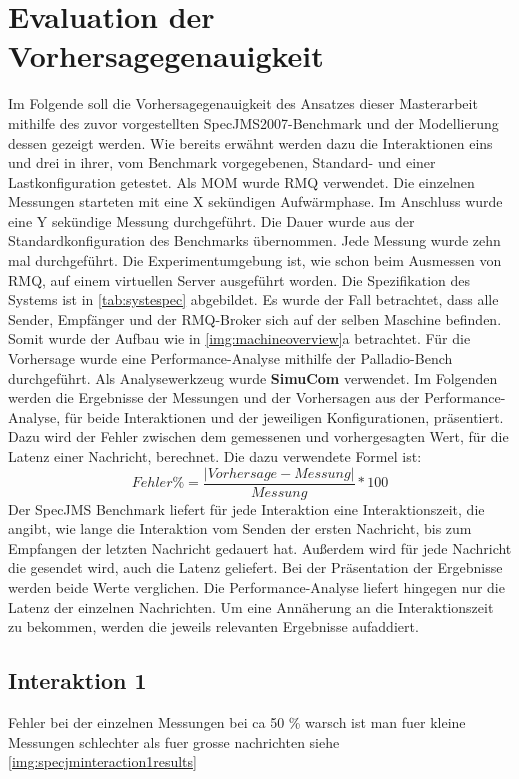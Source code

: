 \section{Evaluation der Vorhersagegenauigkeit}
Im Folgende soll die Vorhersagegenauigkeit des Ansatzes dieser Masterarbeit mithilfe des zuvor vorgestellten SpecJMS2007-Benchmark und der Modellierung dessen gezeigt werden. Wie bereits erwähnt werden dazu die Interaktionen eins und drei in ihrer, vom Benchmark vorgegebenen, Standard- und einer Lastkonfiguration getestet. Als MOM wurde RMQ verwendet. Die einzelnen Messungen starteten mit eine X sekündigen Aufwärmphase. Im Anschluss wurde eine Y sekündige Messung durchgeführt. Die Dauer wurde aus der Standardkonfiguration des Benchmarks übernommen. Jede Messung wurde zehn mal durchgeführt. Die Experimentumgebung ist, wie schon beim Ausmessen von RMQ, auf einem virtuellen Server ausgeführt worden. Die Spezifikation des Systems ist in \autoref{tab:systespec} abgebildet. Es wurde der Fall betrachtet, dass alle Sender, Empfänger und der RMQ-Broker sich auf der selben Maschine befinden. Somit wurde der Aufbau wie in \autoref{img:machineoverview}a betrachtet. Für die Vorhersage wurde eine Performance-Analyse mithilfe der Palladio-Bench durchgeführt. Als Analysewerkzeug wurde \textbf{SimuCom} verwendet. Im Folgenden werden die Ergebnisse der Messungen und der Vorhersagen aus der Performance-Analyse, für beide Interaktionen und der jeweiligen Konfigurationen, präsentiert. Dazu wird der Fehler zwischen dem gemessenen und vorhergesagten Wert, für die Latenz einer Nachricht, berechnet. Die dazu verwendete Formel ist:
\[ Fehler\% = \frac{|Vorhersage - Messung|}{Messung} * 100 \]
Der SpecJMS Benchmark liefert für jede Interaktion eine Interaktionszeit, die angibt, wie lange die Interaktion vom Senden der ersten Nachricht, bis zum Empfangen der letzten Nachricht gedauert hat. Außerdem wird für jede Nachricht die gesendet wird, auch die Latenz geliefert. Bei der Präsentation der Ergebnisse werden beide Werte verglichen. Die Performance-Analyse liefert hingegen nur die Latenz der einzelnen Nachrichten. Um eine Annäherung an die Interaktionszeit zu bekommen, werden die jeweils relevanten Ergebnisse aufaddiert.
\subsection{Interaktion 1}
Fehler bei der einzelnen Messungen bei ca 50 \% warsch ist man fuer kleine Messungen schlechter als fuer grosse nachrichten siehe \autoref{img:specjminteraction1results}

